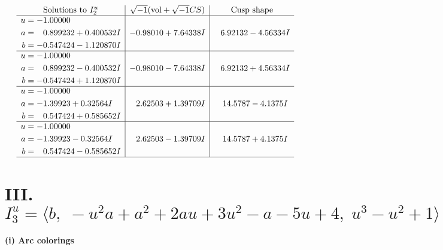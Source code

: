 \documentclass[1p]{elsarticle_modified}
\theoremstyle{definition}
\newcommand{\I}{\sqrt{-1}}
\begin{document}
$$\begin{array}{c|c|c}  
\text{Solutions to }I^u_{2}& \I (\text{vol} + \sqrt{-1}CS) & \text{Cusp shape}\\
 \hline 
\begin{aligned}
u &= -1.00000\phantom{ +0.000000I} \\
a &= \phantom{-}0.899232 + 0.400532 I \\
b &= -0.547424 - 1.120870 I\end{aligned}
 & -0.98010 + 7.64338 I & \phantom{-}6.92132 - 4.56334 I \\ \hline\begin{aligned}
u &= -1.00000\phantom{ +0.000000I} \\
a &= \phantom{-}0.899232 - 0.400532 I \\
b &= -0.547424 + 1.120870 I\end{aligned}
 & -0.98010 - 7.64338 I & \phantom{-}6.92132 + 4.56334 I \\ \hline\begin{aligned}
u &= -1.00000\phantom{ +0.000000I} \\
a &= -1.39923 + 0.32564 I \\
b &= \phantom{-}0.547424 + 0.585652 I\end{aligned}
 & \phantom{-}2.62503 + 1.39709 I & \phantom{-}14.5787 - 4.1375 I \\ \hline\begin{aligned}
u &= -1.00000\phantom{ +0.000000I} \\
a &= -1.39923 - 0.32564 I \\
b &= \phantom{-}0.547424 - 0.585652 I\end{aligned}
 & \phantom{-}2.62503 - 1.39709 I & \phantom{-}14.5787 + 4.1375 I\\
 \hline 
 \end{array}$$\newpage\newpage\renewcommand{\arraystretch}{1}
\centering \section*{III. $I^u_{3}= \langle b,\;- u^2 a+a^2+2 a u+3 u^2- a-5 u+4,\;u^3- u^2+1 \rangle$}
\flushleft \textbf{(i) Arc colorings}\\
\end{document}
